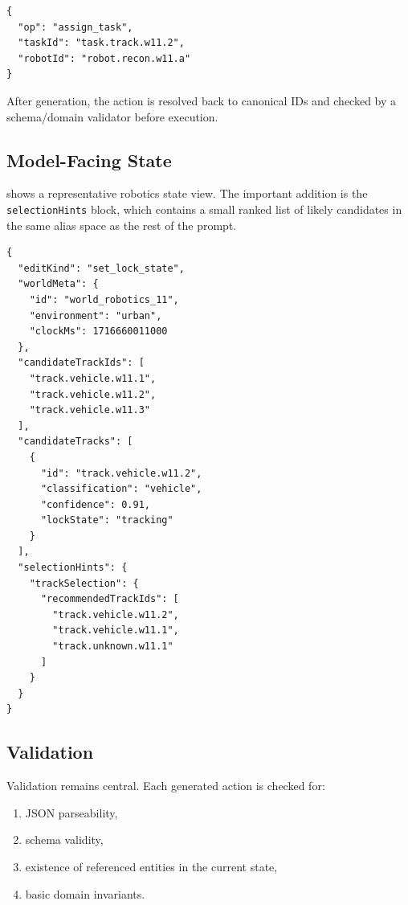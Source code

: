 \documentclass[manuscript,screen,review]{jair}
\begin{document}
\begin{listing}[t]
\caption{Representative coordination edit target.}
\label{lst:coordination-edit}
\begin{verbatim}
{
  "op": "assign_task",
  "taskId": "task.track.w11.2",
  "robotId": "robot.recon.w11.a"
}
\end{verbatim}
\end{listing}

After generation, the action is resolved back to canonical IDs and checked by a schema/domain validator before execution.



\subsection{Model-Facing State}
 shows a representative robotics state view. The important addition is the \texttt{selectionHints} block, which contains a small ranked list of likely candidates in the same alias space as the rest of the prompt.

\begin{listing}[t]
\caption{Representative robotics state view with canonical entity IDs and ranking hints.}
\label{lst:robotics-state-schema}
\begin{verbatim}
{
  "editKind": "set_lock_state",
  "worldMeta": {
    "id": "world_robotics_11",
    "environment": "urban",
    "clockMs": 1716660011000
  },
  "candidateTrackIds": [
    "track.vehicle.w11.1",
    "track.vehicle.w11.2",
    "track.vehicle.w11.3"
  ],
  "candidateTracks": [
    {
      "id": "track.vehicle.w11.2",
      "classification": "vehicle",
      "confidence": 0.91,
      "lockState": "tracking"
    }
  ],
  "selectionHints": {
    "trackSelection": {
      "recommendedTrackIds": [
        "track.vehicle.w11.2",
        "track.vehicle.w11.1",
        "track.unknown.w11.1"
      ]
    }
  }
}
\end{verbatim}
\end{listing}

\subsection{Validation}
Validation remains central. Each generated action is checked for:
\begin{enumerate}[leftmargin=*,itemsep=0.25em]
  \item JSON parseability,
  \item schema validity,
  \item existence of referenced entities in the current state,
  \item basic domain invariants.
\end{enumerate}
\end{document}
